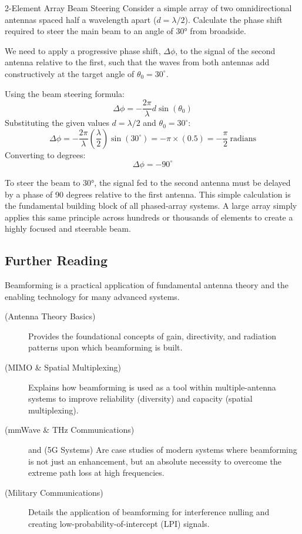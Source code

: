 \begin{workedexample}{2-Element Array Beam Steering}
    Consider a simple array of two omnidirectional antennas spaced half a wavelength apart (\(d = \lambda/2\)). Calculate the phase shift required to steer the main beam to an angle of 30° from broadside.

    We need to apply a progressive phase shift, \(\Delta\phi\), to the signal of the second antenna relative to the first, such that the waves from both antennas add constructively at the target angle of \(\theta_0 = 30^\circ\).
    
    Using the beam steering formula:
    \[ \Delta\phi = -\frac{2\pi}{\lambda} d \sin(\theta_0) \]
    Substituting the given values \(d = \lambda/2\) and \(\theta_0 = 30^\circ\):
    \[ \Delta\phi = -\frac{2\pi}{\lambda} \left(\frac{\lambda}{2}\right) \sin(30^\circ) = -\pi \times (0.5) = -\frac{\pi}{2}~\text{radians} \]
    Converting to degrees:
    \[ \Delta\phi = -90^\circ \]
    
    To steer the beam to 30°, the signal fed to the second antenna must be delayed by a phase of 90 degrees relative to the first antenna. This simple calculation is the fundamental building block of all phased-array systems. A large array simply applies this same principle across hundreds or thousands of elements to create a highly focused and steerable beam.
\end{workedexample}

\begin{importantbox}
\section*{Further Reading}
Beamforming is a practical application of fundamental antenna theory and the enabling technology for many advanced systems.
\begin{description}
    \item[ (Antenna Theory Basics)] Provides the foundational concepts of gain, directivity, and radiation patterns upon which beamforming is built.
    \item[ (MIMO \& Spatial Multiplexing)] Explains how beamforming is used as a tool within multiple-antenna systems to improve reliability (diversity) and capacity (spatial multiplexing).
    \item[ (mmWave \& THz Communications)] and  (5G Systems) Are case studies of modern systems where beamforming is not just an enhancement, but an absolute necessity to overcome the extreme path loss at high frequencies.
    \item[ (Military Communications)] Details the application of beamforming for interference nulling and creating low-probability-of-intercept (LPI) signals.
\end{description}
\end{importantbox}